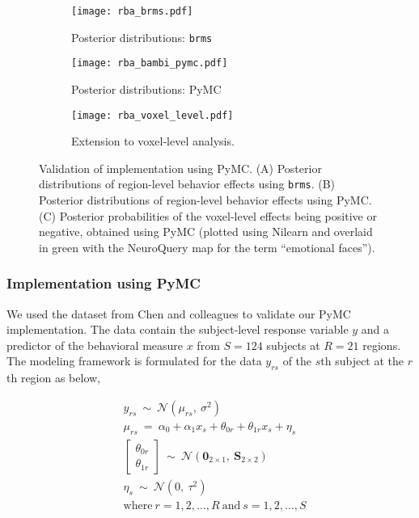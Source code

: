 \documentclass[../main.tex]{subfiles}
\begin{document}
\begin{figure*}[t!]
\centering
\begin{subfigure}{.5\textwidth}
    \centering
    \caption{Posterior distributions: \texttt{brms}}
    \texttt{[image: rba\_brms.pdf]}
    \label{fig:sub1}
\end{subfigure}%
\begin{subfigure}{.5\textwidth}
    \centering
    \caption{Posterior distributions: PyMC}
    \texttt{[image: rba\_bambi\_pymc.pdf]}
    \label{fig:sub2}
\end{subfigure}
\begin{subfigure}{.9\textwidth}
    \centering
    \caption{Extension to voxel-level analysis. }
    \texttt{[image: rba\_voxel\_level.pdf]}
    \label{fig:vox}
\end{subfigure}

\caption{Validation of implementation using PyMC. (A) Posterior distributions of region-level behavior effects using \texttt{brms}. (B) Posterior distributions of region-level behavior effects using PyMC. (C) Posterior probabilities of the voxel-level effects being positive or negative, obtained using PyMC (plotted using Nilearn and overlaid in green with the NeuroQuery\cite{dockes_neuroquery_2020} map for the term ``emotional faces'').}
\label{fig:rba}
\end{figure*}
\subsubsection{Implementation using PyMC}

We used the dataset from Chen and colleagues\cite{chenHandlingMultiplicityNeuroimaging2019} to validate our PyMC implementation. The data contain the subject-level response variable $y$ and a predictor of the behavioral measure $x$ from $S=124$ subjects at $R=21$ regions. The modeling framework is formulated for the data $y_{rs}$ of the $s$th subject at the $r$th region as below,

\begin{equation}\label{eq:bml}
    \begin{split}
	&y_{rs}~\sim~\mathcal{N}(\mu_{rs},~\sigma^2) \\
	&\mu_{rs}~=~\alpha_0+\alpha_1 x_s + \theta_{0r}+\theta_{1r} x_s +\eta_s\\
	&\!\!\begin{bmatrix}
	\theta_{0r} \\
	\theta_{1r} 
	\end{bmatrix}~\sim~\mathcal{N}(\boldsymbol{0}_{2\times 1},~\boldsymbol{S}_{2\times 2}) \\
	&\eta_{s}~\sim~\mathcal{N}(0,~\tau^2) \\
	&\text{where}~r=1,2,\ldots,R~\text{and}~s=1,2,\ldots,S
    \end{split}
\end{equation}
\end{document}
